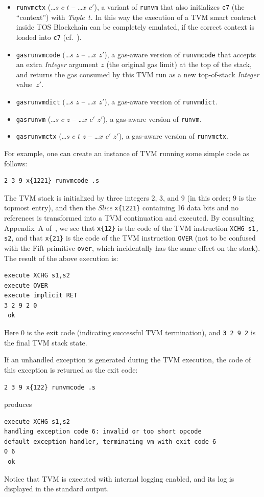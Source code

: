 \documentclass[12pt,oneside]{article}
\begin{document}
\begin{itemize}
\item {\tt runvmctx} (\dots $s$ $c$ $t$ -- \dots $x$ $c'$), a variant of {\tt runvm} that also initializes {\tt c7} (the ``context'') with {\em Tuple\/}~$t$. In this way the execution of a TVM smart contract inside TOS Blockchain can be completely emulated, if the correct context is loaded into {\tt c7} (cf.~\cite[4.4.10]{TBC}).
\item {\tt gasrunvmcode} (\dots $s$ $z$ -- \dots $x$ $z'$), a gas-aware version of {\tt runvmcode} that accepts an extra {\em Integer\/} argument $z$ (the original gas limit) at the top of the stack, and returns the gas consumed by this TVM run as a new top-of-stack {\em Integer\/} value~$z'$.
\item {\tt gasrunvmdict} (\dots $s$ $z$ -- \dots $x$ $z'$), a gas-aware version of {\tt runvmdict}.
\item {\tt gasrunvm} (\dots $s$ $c$ $z$ -- \dots $x$ $c'$ $z'$), a gas-aware version of {\tt runvm}.
\item {\tt gasrunvmctx} (\dots $s$ $c$ $t$ $z$ -- \dots $x$ $c'$ $z'$), a gas-aware version of {\tt runvmctx}.
\end{itemize}
For example, one can create an instance of TVM running some simple code as follows:
\begin{verbatim}
2 3 9 x{1221} runvmcode .s
\end{verbatim}
The TVM stack is initialized by three integers $2$, $3$, and $9$ (in this order; $9$ is the topmost entry), and then the {\em Slice\/} {\tt x\{1221\}} containing 16 data bits and no references is transformed into a TVM continuation and executed. By consulting Appendix~A of~\cite{TVM}, we see that {\tt x\{12\}} is the code of the TVM instruction {\tt XCHG s1, s2}, and that {\tt x\{21\}} is the code of the TVM instruction {\tt OVER} (not to be confused with the Fift primitive {\tt over}, which incidentally has the same effect on the stack). The result of the above execution is:
\begin{verbatim}
execute XCHG s1,s2
execute OVER
execute implicit RET
3 2 9 2 0
 ok
\end{verbatim}
Here $0$ is the exit code (indicating successful TVM termination), and {\tt 3 2 9 2} is the final TVM stack state.

If an unhandled exception is generated during the TVM execution, the code of this exception is returned as the exit code:
\begin{verbatim}
2 3 9 x{122} runvmcode .s
\end{verbatim}
produces
\begin{verbatim}
execute XCHG s1,s2
handling exception code 6: invalid or too short opcode
default exception handler, terminating vm with exit code 6
0 6
 ok
\end{verbatim}
Notice that TVM is executed with internal logging enabled, and its log is displayed in the standard output.
\end{document}
